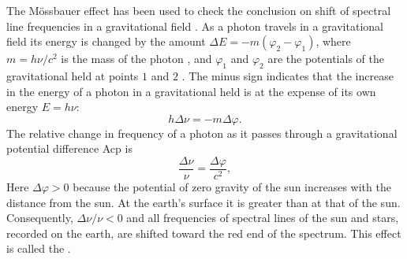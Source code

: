 The M\"ossbauer effect has been used to check the conclusion on shift of spectral line frequencies in a gravitational field . As a photon travels in a gravitational field its energy is changed by the amount $\Delta E = -m (\varphi_{2} - \varphi_{1})$, where $m = h\nu/c^{2}$ is the mass of the photon , and $\varphi_{1}$ and $\varphi_{2}$ are the potentials of the gravitational held at points $\mathit{1}$ and $\mathit{2}$ . The minus sign indicates that the increase in the energy of a photon in a gravitational held is at the expense of its own energy $E = h\nu$:
\begin{equation*}%
h \Delta \nu = -m \Delta \varphi.
\end{equation*}
The relative change in frequency of a photon as it passes through a gravitational potential difference Acp is
\begin{equation*}%
\frac{\Delta \nu}{ \nu} = \frac{\Delta \varphi}{c^{2}},
\end{equation*}
Here $\Delta \varphi > 0$ because the potential of zero gravity of the sun increases with the distance from the sun. At the earth's surface it is greater than at that of the sun. Consequently, $\Delta \nu / \nu < 0$ and all frequencies of spectral lines of the sun and stars, recorded on the earth, are shifted toward the red end of the spectrum. This effect is called the . 

